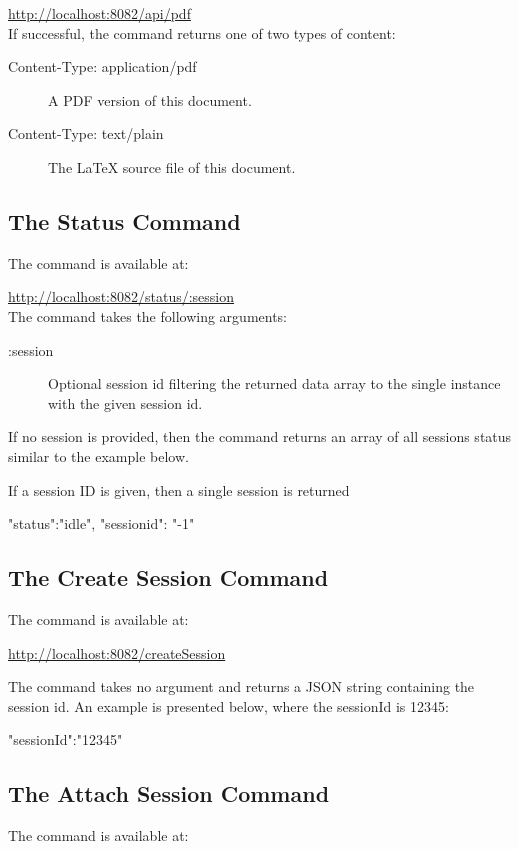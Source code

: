 \url{http://localhost:8082/api/pdf}\\

\noindent If successful, the command returns one of two types of content:
%
\begin{description}
	\item[Content-Type: application/pdf] A PDF version of this document.
	\item[Content-Type: text/plain] The LaTeX source file of this document.
\end{description}
%
%
%
\subsection{The Status Command}
The command is available at:

\url{http://localhost:8082/status/:session}\\

\noindent The command takes the following arguments:

\begin{description}
	\item[:session] Optional session id filtering the returned data array to the single instance with the given session id.
\end{description}

\noindent If no session is provided, then the command returns an array of all
sessions status similar to the example below.
%
%
%
\begin{json}
\end{json}
%
%
%
If a session ID is given, then a single session is returned
%
%
%
\begin{json}
	{
		"status":"idle",
		"sessionid": "-1"
	}
\end{json}
%
%
%
%
\subsection{The Create Session Command}\label{subsec:createSessionCmd}
The command is available at:

\url{http://localhost:8082/createSession}

\noindent The command takes no argument and returns a JSON string containing the
session id. An example is presented below, where the sessionId is 12345:
%
%
%
\begin{json}
	{"sessionId":"12345"}
\end{json}
%
%
%
%
\subsection{The Attach Session Command}\label{subsec:createSessionCmd}
The command is available at:

